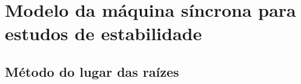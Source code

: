 \section{Modelo da máquina síncrona para estudos de estabilidade}

\lipsum[1]

\subsection{Método do lugar das raízes}
\lipsum[1]


\pagebreak

